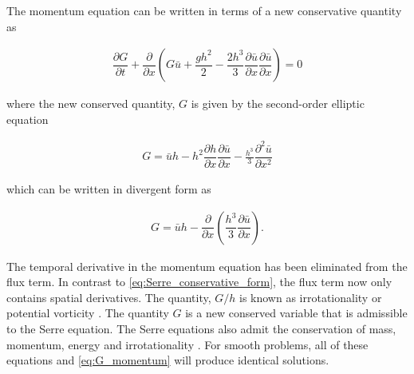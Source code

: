 \documentclass[SingleSpace,12pt]{Serre_ASCE}
\begin{document}
The momentum equation can be written in terms of a new conservative quantity as
\begin{linenomath*}
\begin{gather}\label{eq:G_momentum}
\dfrac{\partial G}{\partial t} + \dfrac{\partial }{\partial x} \left ( G\bar{u} + \dfrac{gh^2}{2} - \dfrac{2 h^3}{3} \dfrac{\partial \bar{u}}{\partial x} \dfrac{\partial \bar{u}}{\partial x} \right ) = 0
\end{gather}
\end{linenomath*}
where the new conserved quantity, $G$ is given by the second-order elliptic equation
\begin{linenomath*}
\begin{gather}\label{eq:G}
G = \bar{u}h - h^2 \dfrac{\partial h}{\partial x} \dfrac{\partial \bar{u}}{\partial x} - \frac{h^3}{3} \dfrac{\partial^2 \bar{u}}{\partial x^2}
\end{gather}
\end{linenomath*}
which can be written in divergent form as
\begin{linenomath*}
\begin{gather}\label{eq:G_divergent}
G = \bar{u}h - \dfrac{\partial }{\partial x} \left ( \dfrac{h^3}{3} \dfrac{\partial \bar{u}}{\partial x} \right ).
\end{gather}
\end{linenomath*}
The temporal derivative in the momentum equation has been eliminated from the flux term. In contrast to \eqref{eq:Serre_conservative_form}, the flux term now only contains spatial derivatives. The quantity, $G/h$ is known as irrotationality \cite{Carter-Cienfuegos-2010-259} or potential vorticity \cite{Dias-Milewski-2010}. The quantity $G$ is a new conserved variable that is admissible to the Serre equation. The Serre equations also admit the conservation of mass, momentum, energy and irrotationality \cite{Bonneton-etal-2011-1479,Carter-Cienfuegos-2010-259}. For smooth problems, all of these equations and \eqref{eq:G_momentum} will produce identical solutions.
\end{document}
